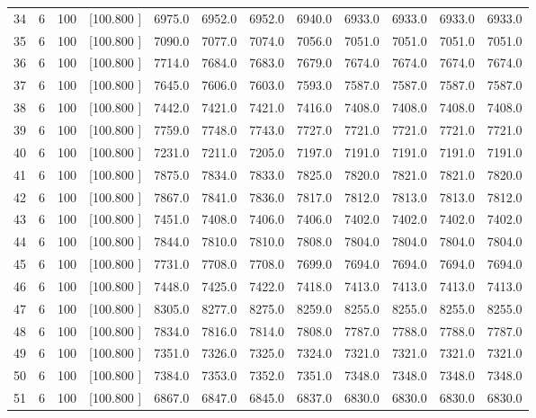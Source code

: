 \documentclass[12pt,a4paper]{article}
\begin{document}
\begin{center}
{\begin{tabular}{r r r r r r r r r r r r}
  34&  6&100&[100.800   ]&  6975.0&  6952.0&  6952.0&  6940.0&  6933.0&  6933.0&  6933.0&  6933.0\\[-0.02in]
  35&  6&100&[100.800   ]&  7090.0&  7077.0&  7074.0&  7056.0&  7051.0&  7051.0&  7051.0&  7051.0\\[-0.02in]
  36&  6&100&[100.800   ]&  7714.0&  7684.0&  7683.0&  7679.0&  7674.0&  7674.0&  7674.0&  7674.0\\[-0.02in]
  37&  6&100&[100.800   ]&  7645.0&  7606.0&  7603.0&  7593.0&  7587.0&  7587.0&  7587.0&  7587.0\\[-0.02in]
  38&  6&100&[100.800   ]&  7442.0&  7421.0&  7421.0&  7416.0&  7408.0&  7408.0&  7408.0&  7408.0\\[-0.02in]
  39&  6&100&[100.800   ]&  7759.0&  7748.0&  7743.0&  7727.0&  7721.0&  7721.0&  7721.0&  7721.0\\[-0.02in]
  40&  6&100&[100.800   ]&  7231.0&  7211.0&  7205.0&  7197.0&  7191.0&  7191.0&  7191.0&  7191.0\\[-0.02in]
  41&  6&100&[100.800   ]&  7875.0&  7834.0&  7833.0&  7825.0&  7820.0&  7821.0&  7821.0&  7820.0\\[-0.02in]
  42&  6&100&[100.800   ]&  7867.0&  7841.0&  7836.0&  7817.0&  7812.0&  7813.0&  7813.0&  7812.0\\[-0.02in]
  43&  6&100&[100.800   ]&  7451.0&  7408.0&  7406.0&  7406.0&  7402.0&  7402.0&  7402.0&  7402.0\\[-0.02in]
  44&  6&100&[100.800   ]&  7844.0&  7810.0&  7810.0&  7808.0&  7804.0&  7804.0&  7804.0&  7804.0\\[-0.02in]
  45&  6&100&[100.800   ]&  7731.0&  7708.0&  7708.0&  7699.0&  7694.0&  7694.0&  7694.0&  7694.0\\[-0.02in]
  46&  6&100&[100.800   ]&  7448.0&  7425.0&  7422.0&  7418.0&  7413.0&  7413.0&  7413.0&  7413.0\\[-0.02in]
  47&  6&100&[100.800   ]&  8305.0&  8277.0&  8275.0&  8259.0&  8255.0&  8255.0&  8255.0&  8255.0\\[-0.02in]
  48&  6&100&[100.800   ]&  7834.0&  7816.0&  7814.0&  7808.0&  7787.0&  7788.0&  7788.0&  7787.0\\[-0.02in]
  49&  6&100&[100.800   ]&  7351.0&  7326.0&  7325.0&  7324.0&  7321.0&  7321.0&  7321.0&  7321.0\\[-0.02in]
  50&  6&100&[100.800   ]&  7384.0&  7353.0&  7352.0&  7351.0&  7348.0&  7348.0&  7348.0&  7348.0\\[-0.02in]
  51&  6&100&[100.800   ]&  6867.0&  6847.0&  6845.0&  6837.0&  6830.0&  6830.0&  6830.0&  6830.0\\[-0.02in]

\end{tabular}}
\end{center}
\end{document}
